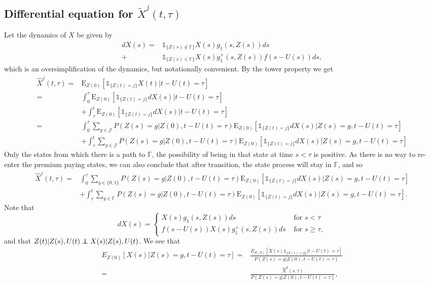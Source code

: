 \documentclass[12pt]{article}
\newcommand{\E}{\text{E}}
\newcommand{\indic}[1]{\mathds{1}_{ \{ #1 \} }}
\newcommand\independent{\protect\mathpalette{\protect\independenT}{\perp}}
\def\independenT#1#2{\mathrel{\rlap{$#1#2$}\mkern2mu{#1#2}}}
\begin{document}
\subsection*{Differential equation for $\tilde{X}^j(t,\tau)$}
Let the dynamics of $X$ be given by
\begin{align*}
dX(s)=& \indic{Z(s) \notin \mathbb{F} } X(s)g_1(s,Z(s)) ds 
\\
+ & \indic{Z(s) \in \mathbb{F} }   X(s) g_1^+(s,Z(s)) f(s-U(s)) ds,
\end{align*}
which is an oversimplification of the dynamics, but notationally convenient. By the tower property we get
\begin{align*}
\hat{X}^j(t,\tau)=& \E_{Z(0)}[ \indic{Z(t)=j}X(t)|t-U(t)=\tau] \\
=& \int_0^{\tau} \E_{Z(0)}[  \indic{Z(t)=j} dX(s)|t-U(t)=\tau] \\
&+  \int_{\tau}^t \E_{Z(0)}[ \indic{Z(t)=j} dX(s)|t-U(t)=\tau]
\\
=& \int_0^{\tau} \sum_{g \in \mathcal{J}} P(Z(s)=g|Z(0),t-U(t)=\tau) \E_{Z(0)}[  \indic{Z(t)=j} dX(s)|Z(s)=g,t-U(t)=\tau] \\
&+  \int_{\tau}^t \sum_{g \in \mathcal{J}} P(Z(s)=g|Z(0),t-U(t)=\tau) \E_{Z(0)}[ \indic{Z(t)=j} dX(s)|Z(s)=g, t-U(t)=\tau]
\end{align*}
Only the states from which there is a path to $\mathbb{F}$, the possibility of being in that state at time $s<\tau$ is positive. As there is no way to re-enter the premium paying states, we can also conclude that after transition, the state process will stay in $\mathbb{F}$, and so
\begin{align*}
\hat{X}^j(t,\tau)=& \int_0^{\tau} \sum_{g \in \{0,1\} } P(Z(s)=g|Z(0),t-U(t)=\tau) \E_{Z(0)}[  \indic{Z(t)=j} dX(s)|Z(s)=g,t-U(t)=\tau] \\
&+  \int_{\tau}^t \sum_{g \in \mathbb{F}} P(Z(s)=g|Z(0),t-U(t)=\tau) \E_{Z(0)}[ \indic{Z(t)=j} dX(s)|Z(s)=g, t-U(t)=\tau].
\end{align*}
Note that 
$$
dX(s)= \begin{cases}
X(s)g_1(s,Z(s)) ds \qquad &\text{ for } s < \tau \\
f(s-U(s)) X(s)g_1^+(s,Z(s))  ds &\text{ for } s \geq \tau,
\end{cases}
$$
and that $Z(t)|Z(s),U(t) \independent  X(s)|Z(s),U(t)$. We see that
\begin{align*}
E_{Z(0)}[ X(s)|Z(s)=g,t-U(t)=\tau] =& 
\frac{E_{Z(0)}[ X(s)\indic{Z(s)=g}|t-U(t)=\tau]}{P(Z(s)=g|Z(0),t-U(t)=\tau)}
\\
=&\frac{ \hat{X}^g(s,\tau)}{P(Z(s)=g|Z(0),t-U(t)=\tau)},
\end{align*}
\end{document}

